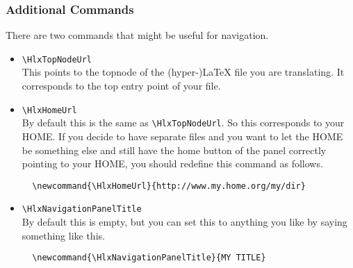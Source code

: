\subsubsection{Additional Commands}

There are two commands that might be useful for navigation.
\begin{itemize}
\item \verb'\HlxTopNodeUrl'\\
  This points to the topnode of the (hyper-)\LaTeX{} file you are
  translating. It corresponds to the top entry point of your file.
\item \verb'\HlxHomeUrl'\\
  By default this is the same as \verb'\HlxTopNodeUrl'. So this
  corresponds to your HOME. If you decide to have separate files and
  you want to let the HOME be something else and still have the home
  button of the panel correctly pointing to your HOME, you should
  redefine this command as follows.\\
\begin{verbatim}
  \newcommand{\HlxHomeUrl}{http://www.my.home.org/my/dir}
\end{verbatim}
\item \verb'\HlxNavigationPanelTitle'\\
  By default this is empty, but you can set this to anything you like
  by saying something like this.
\begin{verbatim}
  \newcommand{\HlxNavigationPanelTitle}{MY TITLE}
\end{verbatim}
\end{itemize}

